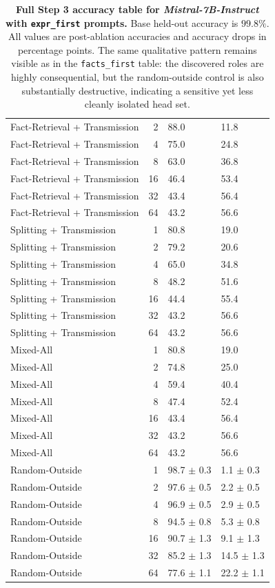\documentclass[11pt]{article}
\begin{document}
\begin{table}[p]
{\begin{tabular}{@{} l r l l @{}}
Fact-Retrieval + Transmission & 2 & 88.0 & 11.8 \\
Fact-Retrieval + Transmission & 4 & 75.0 & 24.8 \\
Fact-Retrieval + Transmission & 8 & 63.0 & 36.8 \\
Fact-Retrieval + Transmission & 16 & 46.4 & 53.4 \\
Fact-Retrieval + Transmission & 32 & 43.4 & 56.4 \\
Fact-Retrieval + Transmission & 64 & 43.2 & 56.6 \\
Splitting + Transmission & 1 & 80.8 & 19.0 \\
Splitting + Transmission & 2 & 79.2 & 20.6 \\
Splitting + Transmission & 4 & 65.0 & 34.8 \\
Splitting + Transmission & 8 & 48.2 & 51.6 \\
Splitting + Transmission & 16 & 44.4 & 55.4 \\
Splitting + Transmission & 32 & 43.2 & 56.6 \\
Splitting + Transmission & 64 & 43.2 & 56.6 \\
Mixed-All & 1 & 80.8 & 19.0 \\
Mixed-All & 2 & 74.8 & 25.0 \\
Mixed-All & 4 & 59.4 & 40.4 \\
Mixed-All & 8 & 47.4 & 52.4 \\
Mixed-All & 16 & 43.4 & 56.4 \\
Mixed-All & 32 & 43.2 & 56.6 \\
Mixed-All & 64 & 43.2 & 56.6 \\
Random-Outside & 1 & 98.7 $\pm$ 0.3 & 1.1 $\pm$ 0.3 \\
Random-Outside & 2 & 97.6 $\pm$ 0.5 & 2.2 $\pm$ 0.5 \\
Random-Outside & 4 & 96.9 $\pm$ 0.5 & 2.9 $\pm$ 0.5 \\
Random-Outside & 8 & 94.5 $\pm$ 0.8 & 5.3 $\pm$ 0.8 \\
Random-Outside & 16 & 90.7 $\pm$ 1.3 & 9.1 $\pm$ 1.3 \\
Random-Outside & 32 & 85.2 $\pm$ 1.3 & 14.5 $\pm$ 1.3 \\
Random-Outside & 64 & 77.6 $\pm$ 1.1 & 22.2 $\pm$ 1.1 \\
\bottomrule
\end{tabular}%
}
\caption{\textbf{Full Step 3 accuracy table for \textit{Mistral-7B-Instruct} with \texttt{expr\_first} prompts.} Base held-out accuracy is $99.8\%$. All values are post-ablation accuracies and accuracy drops in percentage points. The same qualitative pattern remains visible as in the \texttt{facts\_first} table: the discovered roles are highly consequential, but the random-outside control is also substantially destructive, indicating a sensitive yet less cleanly isolated head set.}
\label{tab:mistral_ef_full_accuracy}
\end{table}
\end{document}
